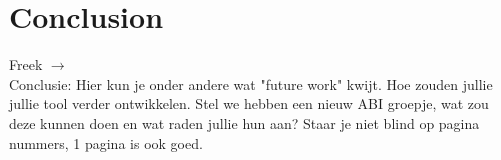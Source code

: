 \chapter*{Conclusion}

\begin{tcolorbox}[colback=yellow!30]
Freek $\rightarrow$ \\
 Conclusie: Hier kun je onder andere wat "future work" kwijt. Hoe zouden jullie jullie tool verder ontwikkelen. Stel we hebben een nieuw ABI groepje, wat zou deze kunnen doen en wat raden jullie hun aan? Staar je niet blind op pagina nummers, 1 pagina is ook goed.
\end{tcolorbox}


